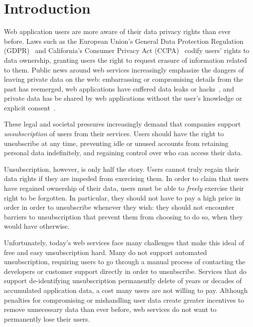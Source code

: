 \section{Introduction}

Web application users are more aware of their data privacy rights than ever before. 
Laws such as the European Union's General Data Protection Regulation (GDPR)~\cite{eu:gdpr} and
California's Consumer Privacy Act (CCPA)~\cite{ca:privacy-act} codify users' rights to 
data ownership, granting users the right to request erasure of information related to them.
%
Public news around web services increasingly emphasize the dangers of leaving private data on the
web: embarrassing or compromising details from the past has reemerged, web applications have
suffered data leaks or hacks~\cite{breach:twitter, breach:fb, breach:mariott, breach:quora}, and
private data has be shared by web applications without the user's knowledge or explicit
consent~\cite{nytimes:fb, npr:data}.

%
These legal and societal pressures increasingly demand that companies support \emph{unsubscription}
of users from their services.  Users should have the right to unsubscribe at any time, preventing
idle or unused accounts from retaining personal data indefinitely, and regaining control over who
can access their data. 
%

%
Unsubscription, however, is only half the story. Users cannot truly regain their data rights if they
are impeded from exercising them. In order to claim that users have regained ownership of their
data, users must be able to \emph{freely} exercise their right to be forgotten. In particular, they
should not have to pay a high price in order in order to unsubscribe whenever they wish: they should
not encounter barriers to unsubscription that prevent them from choosing to do so, when they would have
otherwise. 

Unfortunately, today's web services face many challenges that make this ideal of free and easy
unsubscription hard.  Many do not support automated unsubscription, requiring users to go through a
manual process of contacting the developers or customer support directly in order to unsubscribe.
Services that do support de-identifying unsubscription permanently delete of years or decades of
accumulated application data, a cost many users are not willing to pay.  Although penalties for
compromising or mishandling user data create greater incentives to remove unnecessary data than ever
before, web services do not want to permanently lose their users.

